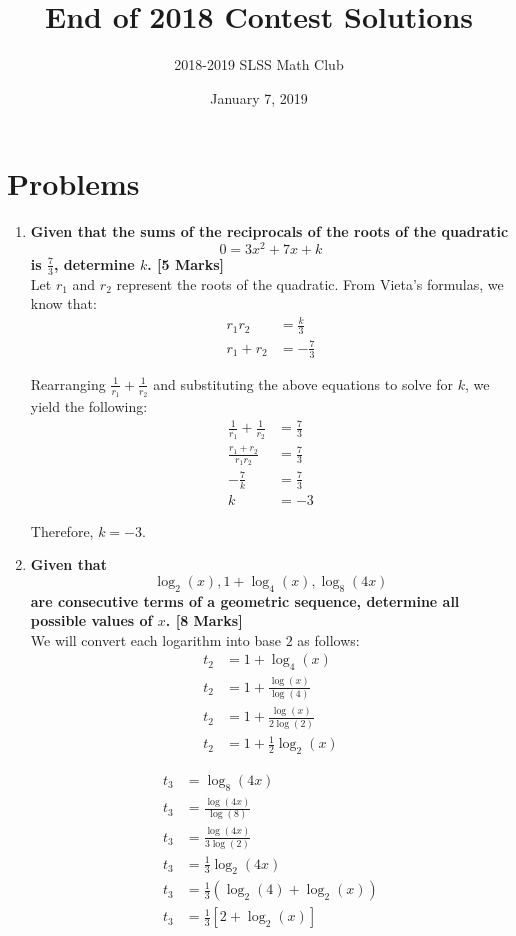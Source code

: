 \documentclass[12pt]{article}
\title{End of 2018 Contest Solutions\vspace{-3mm}}
\author{2018-2019 SLSS Math Club\vspace{-5mm}}
\date{January 7, 2019\vspace{-5mm}}
\begin{document}
\maketitle

\section*{Problems}
\begin{enumerate}
    \item \textbf{Given that the sums of the reciprocals of the roots of the quadratic $$ 0 = 3x^2 + 7x + k$$ is $\displaystyle{\frac{7}{3}}$, determine $k$. [5 Marks]} \\
    
    Let $r_1$ and $r_2$ represent the roots of the quadratic.  From Vieta's formulas, we know that:
    \begin{align*}
        r_1r_2 &= \frac{k}{3} \\
        r_1 + r_2 &= -\frac{7}{3}
    \end{align*}
    
    Rearranging $\frac{1}{r_1} + \frac{1}{r_2}$ and substituting the above equations to solve for $k$, we yield the following:
    \begin{align*}
        \frac{1}{r_1} + \frac{1}{r_2} &= \frac{7}{3} \\
        \frac{r_1 + r_2}{r_1r_2} &= \frac{7}{3} \\
        -\frac{7}{k} &= \frac{7}{3} \\
        k &= -3
    \end{align*}
    
    Therefore, $k = -3$. 
    
    \item \textbf{Given that $$\log_2(x), 1 + \log_4(x), \log_8(4x)$$ are consecutive terms of a geometric sequence, determine all possible values of $x$. [8 Marks]} \\
    
    We will convert each logarithm into base $2$ as follows:
    \begin{align*}
        t_2 &= 1 + \log_4(x) \\
        t_2 &= 1 + \frac{\log(x)}{\log(4)} \\
        t_2 &= 1 + \frac{\log(x)}{2\log(2)} \\
        t_2 &= 1 + \frac{1}{2}\log_2(x)
    \end{align*}
    
    \begin{align*}
        t_3 &= \log_8(4x) \\
        t_3 &= \frac{\log(4x)}{\log(8)} \\
        t_3 &= \frac{\log(4x)}{3\log(2)} \\
        t_3 &= \frac{1}{3}\log_2(4x) \\
        t_3 &= \frac{1}{3}(\log_2(4) + \log_2(x)) \\
        t_3 &= \frac{1}{3}[2 + \log_2(x)]
    \end{align*}
    

\end{enumerate}
\end{document}
